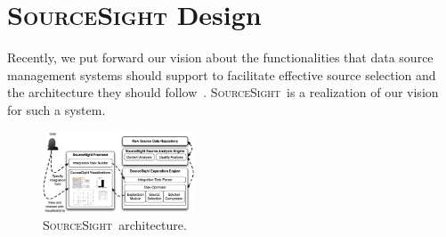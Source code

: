 \documentclass{vldb}
\newcommand\system{\textsc{SourceSight}}
\begin{document}
\section{{\Large \system} Design}
\label{sec:design}
Recently, we put forward our vision about the functionalities that data source management systems should support to facilitate effective source selection and the architecture they should follow~\cite{rekatsinas:2015}. 
\system~is a realization of our vision for such a system. %


\begin{figure}[h]
    \centering
    \includegraphics[width=0.4\textwidth]{fig/srcsightOver}
    	\vspace{-10pt}
    \caption{\system~architecture.}
    \label{fig:architecture}
    	\vspace{-10pt}
\end{figure}
\end{document}
